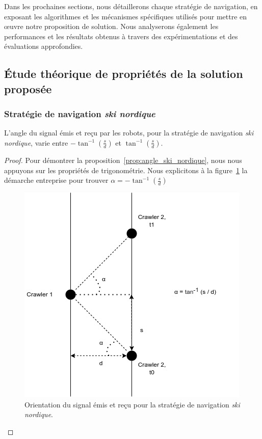 \documentclass[francais,RandD]{rapportPFE}
\begin{document}
				Dans les prochaines sections, nous détaillerons chaque stratégie de navigation, en exposant les algorithmes et les mécanismes spécifiques utilisés pour mettre en œuvre notre proposition de solution. Nous analyserons également les performances et les résultats obtenus à travers des expérimentations et des évaluations approfondies.
		\subsection{Étude théorique de propriétés de la solution proposée}
			\subsubsection*{Stratégie de navigation \textit{ski nordique}}
				\begin{Proposition}
					L'angle du signal émis et reçu par les robots, pour la stratégie de navigation \textit{ski nordique}, varie entre $-\tan^{-1}(\frac{s}{d})$ et $\tan^{-1}(\frac{s}{d})$.
					\label{prop:angle_ski_nordique}
				\end{Proposition}
				\begin{proof}
					Pour démontrer la proposition~\ref{prop:angle_ski_nordique}, nous nous appuyons sur les propriétés de trigonométrie.
					Nous explicitons à la figure~\ref{fig:angle_ski_nordique} la démarche entreprise pour trouver $\alpha = -\tan^{-1}(\frac{s}{d})$

					\begin{figure}[h!]
						\centering
						\includegraphics[scale=0.5]{graphics/angle_ski_nordique.png}
						\caption{Orientation du signal émis et reçu pour la stratégie de navigation \textit{ski nordique}.}
						\label{fig:angle_ski_nordique}
					\end{figure}
				\end{proof}
\end{document}
